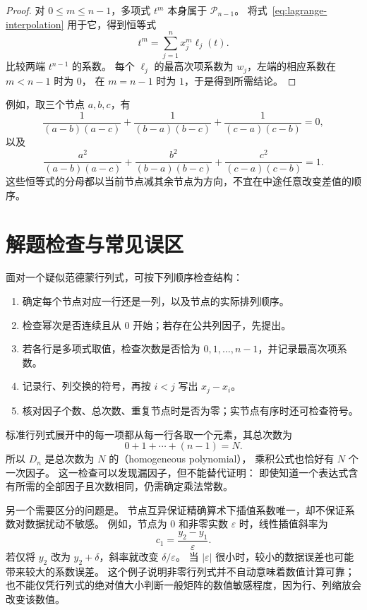 \documentclass[UTF8,12pt,a4paper,fontset=fandol]{ctexart}
\begin{document}
\begin{proof}
对 $0\leq m\leq n-1$，多项式 $t^m$ 本身属于 $\mathcal P_{n-1}$。
将式~\eqref{eq:lagrange-interpolation} 用于它，得到恒等式
\[
  t^m=\sum_{j=1}^n x_j^m\ell_j(t).
\]
比较两端 $t^{n-1}$ 的系数。
每个 $\ell_j$ 的最高次项系数为 $w_j$，左端的相应系数在 $m<n-1$ 时为 $0$，
在 $m=n-1$ 时为 $1$，于是得到所需结论。
\end{proof}

例如，取三个节点 $a,b,c$，有
\[
  \frac{1}{(a-b)(a-c)}+
  \frac{1}{(b-a)(b-c)}+
  \frac{1}{(c-a)(c-b)}=0,
\]
以及
\[
  \frac{a^2}{(a-b)(a-c)}+
  \frac{b^2}{(b-a)(b-c)}+
  \frac{c^2}{(c-a)(c-b)}=1.
\]
这些恒等式的分母都以当前节点减其余节点为方向，不宜在中途任意改变差值的顺序。

\section{解题检查与常见误区}

面对一个疑似范德蒙行列式，可按下列顺序检查结构：
\begin{enumerate}
  \item 确定每个节点对应一行还是一列，以及节点的实际排列顺序。
  \item 检查幂次是否连续且从 $0$ 开始；若存在公共列因子，先提出。
  \item 若各行是多项式取值，检查次数是否恰为 $0,1,\ldots,n-1$，并记录最高次项系数。
  \item 记录行、列交换的符号，再按 $i<j$ 写出 $x_j-x_i$。
  \item 核对因子个数、总次数、重复节点时是否为零；实节点有序时还可检查符号。
\end{enumerate}

标准行列式展开中的每一项都从每一行各取一个元素，其总次数为
\[
  0+1+\cdots+(n-1)=N.
\]
所以 $D_n$ 是总次数为 $N$ 的（homogeneous polynomial），
乘积公式也恰好有 $N$ 个一次因子。
这一检查可以发现漏因子，但不能替代证明：
即使知道一个表达式含有所需的全部因子且次数相同，仍需确定乘法常数。

另一个需要区分的问题是。
节点互异保证精确算术下插值系数唯一，却不保证系数对数据扰动不敏感。
例如，节点为 $0$ 和非零实数 $\varepsilon$ 时，线性插值斜率为
\[
  c_1=\frac{y_2-y_1}{\varepsilon}.
\]
若仅将 $y_2$ 改为 $y_2+\delta$，斜率就改变 $\delta/\varepsilon$。
当 $|\varepsilon|$ 很小时，较小的数据误差也可能带来较大的系数误差。
这个例子说明非零行列式并不自动意味着数值计算可靠；
也不能仅凭行列式的绝对值大小判断一般矩阵的数值敏感程度，因为行、列缩放会改变该数值。
\end{document}
